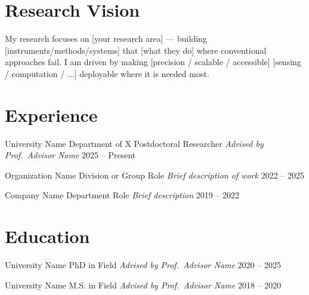 \documentclass{short-CV}
\begin{document}
\maketitle

\section{Research Vision}

My research focuses on [your research area] --- building [instruments/methods/systems]
that [what they do] where conventional approaches fail. I am driven by making
[precision / scalable / accessible] [sensing / computation / ...] deployable
where it is needed most.

\section{Experience}

\cventry
  {University Name}
  {Department of X}
  {Postdoctoral Researcher \enspace\textbar\enspace \textit{Advised by Prof.\ Advisor Name}}
  {2025 -- Present}

\cventry
  {Organization Name}
  {Division or Group}
  {Role \enspace\textbar\enspace \textit{Brief description of work}}
  {2022 -- 2025}

\cventry
  {Company Name}
  {Department}
  {Role \enspace\textbar\enspace \textit{Brief description}}
  {2019 -- 2022}

\section{Education}

\cvedu
  {University Name}
  {PhD in Field \enspace\textbar\enspace \textit{Advised by Prof.\ Advisor Name}}
  {2020 -- 2025}

\cvedu
  {University Name}
  {M.S. in Field \enspace\textbar\enspace \textit{Advised by Prof.\ Advisor Name}}
  {2018 -- 2020}
\end{document}
